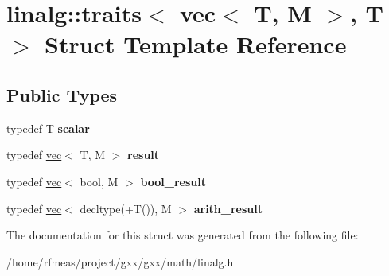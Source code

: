 \hypertarget{structlinalg_1_1traits_3_01vec_3_01T_00_01M_01_4_00_01T_01_4}{}\section{linalg\+:\+:traits$<$ vec$<$ T, M $>$, T $>$ Struct Template Reference}
\label{structlinalg_1_1traits_3_01vec_3_01T_00_01M_01_4_00_01T_01_4}
\subsection*{Public Types}
\begin{DoxyCompactItemize}
\item 
typedef T {\bfseries scalar}\hypertarget{structlinalg_1_1traits_3_01vec_3_01T_00_01M_01_4_00_01T_01_4_a98a667bc74be35468b661f2e81052958}{}\label{structlinalg_1_1traits_3_01vec_3_01T_00_01M_01_4_00_01T_01_4_a98a667bc74be35468b661f2e81052958}

\item 
typedef \hyperlink{structlinalg_1_1vec}{vec}$<$ T, M $>$ {\bfseries result}\hypertarget{structlinalg_1_1traits_3_01vec_3_01T_00_01M_01_4_00_01T_01_4_a758239ab701b5c50674484f50ef6dd45}{}\label{structlinalg_1_1traits_3_01vec_3_01T_00_01M_01_4_00_01T_01_4_a758239ab701b5c50674484f50ef6dd45}

\item 
typedef \hyperlink{structlinalg_1_1vec}{vec}$<$ bool, M $>$ {\bfseries bool\+\_\+result}\hypertarget{structlinalg_1_1traits_3_01vec_3_01T_00_01M_01_4_00_01T_01_4_a201fdf8ea0a268ba368d098579d908c5}{}\label{structlinalg_1_1traits_3_01vec_3_01T_00_01M_01_4_00_01T_01_4_a201fdf8ea0a268ba368d098579d908c5}

\item 
typedef \hyperlink{structlinalg_1_1vec}{vec}$<$ decltype(+T()), M $>$ {\bfseries arith\+\_\+result}\hypertarget{structlinalg_1_1traits_3_01vec_3_01T_00_01M_01_4_00_01T_01_4_af09e2fa958d147932d12e908da4d7195}{}\label{structlinalg_1_1traits_3_01vec_3_01T_00_01M_01_4_00_01T_01_4_af09e2fa958d147932d12e908da4d7195}

\end{DoxyCompactItemize}


The documentation for this struct was generated from the following file\+:\begin{DoxyCompactItemize}
\item 
/home/rfmeas/project/gxx/gxx/math/linalg.\+h\end{DoxyCompactItemize}
